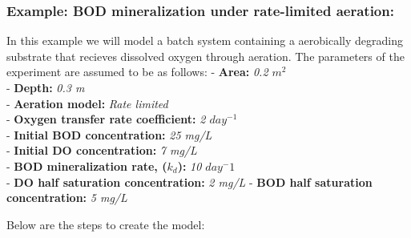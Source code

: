 \subsubsection{Example: BOD mineralization under rate-limited aeration: }
In this example we will model a batch system containing a aerobically degrading substrate that recieves dissolved oxygen through aeration. The parameters of the experiment are assumed to be as follows:
- \textbf{Area: } \textit{0.2 $m^2$}\\
- \textbf{Depth: } \textit{0.3 m}\\
- \textbf{Aeration model: } \textit{Rate limited} \\
- \textbf{Oxygen transfer rate coefficient: } \textit{2 $day^{-1}$}\\
- \textbf{Initial BOD concentration: } \textit{25 mg/L}\\
- \textbf{Initial DO concentration: } \textit{7 mg/L}\\
- \textbf{BOD mineralization rate, ($k_d$): } \textit{10 $day^-1$}\\
- \textbf{DO half saturation concentration: } \textit{2 mg/L}
- \textbf{BOD half saturation concentration: } \textit{5 mg/L}


Below are the steps to create the model:

